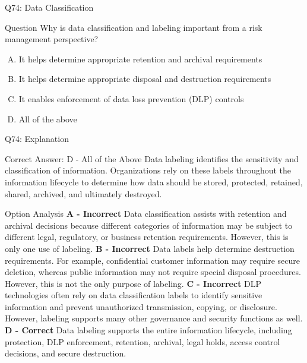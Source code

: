 \documentclass{beamer}
\begin{document}
	
	\begin{frame}{Q74: Data Classification} \begin{block}{Question} Why is data classification and labeling important from a risk management perspective? \end{block} \begin{enumerate}[(A)] \item It helps determine appropriate retention and archival requirements \item It helps determine appropriate disposal and destruction requirements \item It enables enforcement of data loss prevention (DLP) controls \item All of the above \end{enumerate}  \end{frame} \begin{frame}[shrink=10]{Q74: Explanation} \footnotesize \begin{block}{Correct Answer: D - All of the Above} Data labeling identifies the sensitivity and classification of information. Organizations rely on these labels throughout the information lifecycle to determine how data should be stored, protected, retained, shared, archived, and ultimately destroyed. \end{block} \begin{block}{Option Analysis} \textbf{A - Incorrect} Data classification assists with retention and archival decisions because different categories of information may be subject to different legal, regulatory, or business retention requirements. However, this is only one use of labeling. \vspace{0.15cm} \textbf{B - Incorrect} Data labels help determine destruction requirements. For example, confidential customer information may require secure deletion, whereas public information may not require special disposal procedures. However, this is not the only purpose of labeling. \vspace{0.15cm} \textbf{C - Incorrect} DLP technologies often rely on data classification labels to identify sensitive information and prevent unauthorized transmission, copying, or disclosure. However, labeling supports many other governance and security functions as well. \vspace{0.15cm} \textbf{D - Correct} Data labeling supports the entire information lifecycle, including protection, DLP enforcement, retention, archival, legal holds, access control decisions, and secure destruction. \end{block}  \end{frame}
	
\end{document}
